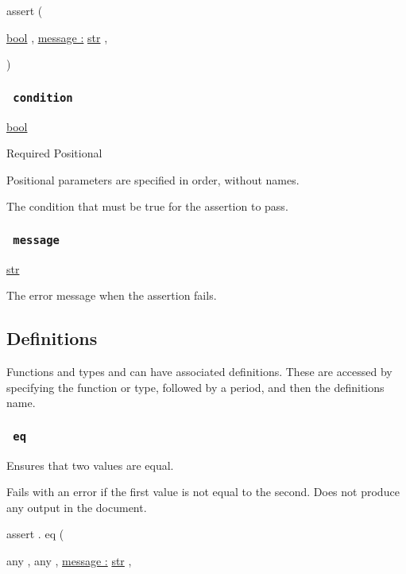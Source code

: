 { assert } (

{ \href{/docs/reference/foundations/bool/}{bool} , } {
\hyperref[parameters-message]{message :}
\href{/docs/reference/foundations/str/}{str} , }

)

\subsubsection{\texorpdfstring{\texttt{\ condition\ }}{ condition }}\label{parameters-condition}

\href{/docs/reference/foundations/bool/}{bool}

{Required} {{ Positional }}

\label{parameters-condition-positional-tooltip}
Positional parameters are specified in order, without names.

The condition that must be true for the assertion to pass.

\subsubsection{\texorpdfstring{\texttt{\ message\ }}{ message }}\label{parameters-message}

\href{/docs/reference/foundations/str/}{str}

The error message when the assertion fails.

\subsection{\texorpdfstring{{ Definitions
}}{ Definitions }}\label{definitions}

\label{definitions-tooltip}
Functions and types and can have associated definitions. These are
accessed by specifying the function or type, followed by a period, and
then the definition\textquotesingle s name.

\subsubsection{\texorpdfstring{\texttt{\ eq\ }}{ eq }}\label{definitions-eq}

Ensures that two values are equal.

Fails with an error if the first value is not equal to the second. Does
not produce any output in the document.

assert { . } { eq } (

{ { any } , } { { any } , } {
\hyperref[definitions-eq-parameters-message]{message :}
\href{/docs/reference/foundations/str/}{str} , }

